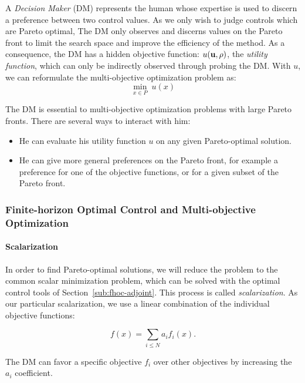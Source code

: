 			
			A \emph{Decision Maker} (DM) represents the human whose expertise is used to discern a preference between two control values. As we only wish to judge controls which are Pareto optimal, The DM only observes and discerns values on the Pareto front to limit the search space and improve the efficiency of the method. As a consequence, the DM has a hidden objective function: $u\left(\vectorize{u}, \vectorize{\rho}\right)$, the \emph{utility function}, which can only be indirectly observed through probing the DM. With $u$, we can reformulate the multi-objective optimization problem as:
			\begin{equation}\label{eq:multiobj_dm}
					\min_{x\in P} \;u(x)
			\end{equation}

			The DM is essential to multi-objective optimization problems with large Pareto fronts.  There are several ways to interact with him:
			\begin{itemize}
				\item He can evaluate his utility function $u$ on any given Pareto-optimal solution.
				\item He can give more general preferences on the Pareto front, for example a preference for one of the objective functions, or for a given subset of the Pareto front.
			\end{itemize}

			

			
			
		\subsubsection{Finite-horizon Optimal Control and Multi-objective Optimization}
			\paragraph{Scalarization}
In order to find Pareto-optimal solutions, we will reduce the problem to the common scalar minimization problem, which can be solved with the optimal control tools of Section~\ref{sub:fhoc-adjoint}. This process is called \emph{scalarization}. As our particular scalarization, we use a linear combination of the individual objective functions:

\begin{equation}
\label{eqn:linear-combo}
f(x) = \sum_{i \leq N} a_i f_i(x).
\end{equation}

The DM can favor a specific objective $f_i$ over other objectives by increasing the $a_i$ coefficient.

